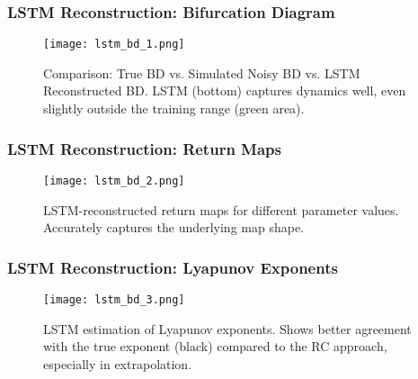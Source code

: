 \documentclass{beamer}
\begin{document}
\begin{frame}
    \frametitle{LSTM Reconstruction: Bifurcation Diagram}
    \begin{figure}
        \centering
        \texttt{[image: lstm\_bd\_1.png]}
        \caption{Comparison: True BD vs. Simulated Noisy BD vs. LSTM Reconstructed BD. LSTM (bottom) captures dynamics well, even slightly outside the training range (green area).}
        \label{fig:lstm_bd_1_slide}
    \end{figure}
\end{frame}

\begin{frame}
    \frametitle{LSTM Reconstruction: Return Maps}
    \begin{figure}
        \centering
        \texttt{[image: lstm\_bd\_2.png]}
        \caption{LSTM-reconstructed return maps for different parameter values. Accurately captures the underlying map shape.}
        \label{fig:lstm_bd_2_slide}
    \end{figure}
\end{frame}

\begin{frame}
    \frametitle{LSTM Reconstruction: Lyapunov Exponents}
    \begin{figure}
        \centering
        \texttt{[image: lstm\_bd\_3.png]}
        \caption{LSTM estimation of Lyapunov exponents. Shows better agreement with the true exponent (black) compared to the RC approach, especially in extrapolation.}
        \label{fig:lstm_bd_3_slide} %
    \end{figure}
\end{frame}
\end{document}
